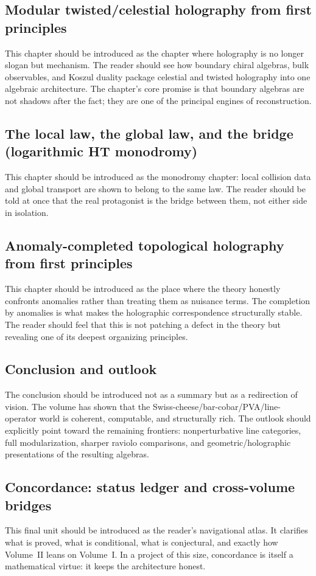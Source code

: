 \subsection*{Modular twisted/celestial holography from first principles}
This chapter should be introduced as the chapter where holography is no longer slogan but mechanism.  The reader should see how boundary chiral algebras, bulk observables, and Koszul duality package celestial and twisted holography into one algebraic architecture.  The chapter's core promise is that boundary algebras are not shadows after the fact; they are one of the principal engines of reconstruction.

\subsection*{The local law, the global law, and the bridge (logarithmic HT monodromy)}
This chapter should be introduced as the monodromy chapter: local collision data and global transport are shown to belong to the same law.  The reader should be told at once that the real protagonist is the bridge between them, not either side in isolation.

\subsection*{Anomaly-completed topological holography from first principles}
This chapter should be introduced as the place where the theory honestly confronts anomalies rather than treating them as nuisance terms.  The completion by anomalies is what makes the holographic correspondence structurally stable.  The reader should feel that this is not patching a defect in the theory but revealing one of its deepest organizing principles.

\subsection*{Conclusion and outlook}
The conclusion should be introduced not as a summary but as a redirection of vision.  The volume has shown that the Swiss-cheese/bar-cobar/PVA/line-operator world is coherent, computable, and structurally rich.  The outlook should explicitly point toward the remaining frontiers: nonperturbative line categories, full modularization, sharper raviolo comparisons, and geometric/holographic presentations of the resulting algebras.

\subsection*{Concordance: status ledger and cross-volume bridges}
This final unit should be introduced as the reader's navigational atlas.  It clarifies what is proved, what is conditional, what is conjectural, and exactly how Volume~II leans on Volume~I.  In a project of this size, concordance is itself a mathematical virtue: it keeps the architecture honest.

